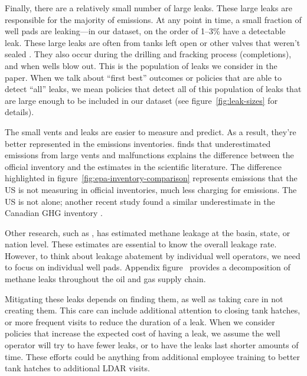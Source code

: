 Finally, there are a relatively small number of large leaks.
These large leaks are responsible for the majority of emissions.
At any point in time, a small fraction of well pads are leaking---in our dataset, on the order of 1--3\% have a detectable leak.
These large leaks are often from tanks left open or other valves that weren't sealed
\parencite{Lyon/Alvarez/Zavala-Araiza/Brandt/Jackson/Hamburg:2016}.
They also occur during the drilling and fracking process (completions), and when wells blow out.
This is the population of leaks we consider in the paper.
When we talk about ``first best'' outcomes or policies that are able to detect ``all'' leaks, we mean policies that detect all of this population of leaks that are large enough to be included in our dataset (see figure~\ref{fig:leak-sizes} for details).

The small vents and leaks are easier to measure and predict.
As a result, they're better represented in the emissions inventories.
\textcite{Rutherford/etal:2021} finds that underestimated emissions from large vents and malfunctions explains the difference between the official inventory and the estimates in the scientific literature.
The difference highlighted in figure~\ref{fig:epa-inventory-comparison}  represents emissions that the US is not measuring in official inventories, much less charging for emissions.
The US is not alone; another recent study found a similar underestimate in the Canadian \gls{GHG} inventory \parencite{Chan/Worthy/Chan/Ishizawa/Moran/Delcloo/Vogel:2020}.


Other research, such as \textcite{Alvarez/etal:2018}, has estimated methane leakage at the basin, state, or nation level.
These estimates are essential to know the overall leakage rate.
However, to think about leakage abatement by individual well operators, we need to focus on individual well pads.
Appendix figure~\iftoggle{usexr}{\ref{fig:EPA-leak-percentages-Marks}}{A4} provides a decomposition of methane leaks throughout the oil and gas supply chain.

Mitigating these leaks depends on finding them, as well as taking care in not creating them.
This care can include additional attention to closing tank hatches, or more frequent visits to reduce the duration of a leak.
When we consider policies that increase the expected cost of having a leak, we assume the well operator will try to have fewer leaks, or to have the leaks last shorter amounts of time.
These efforts could be anything from additional employee training to better tank hatches to additional \gls{LDAR} visits.

